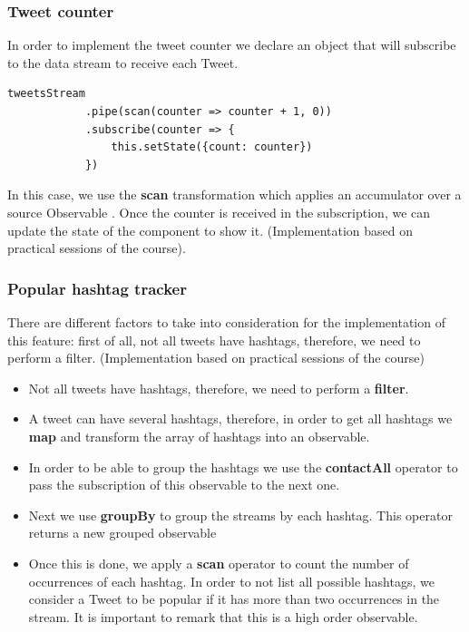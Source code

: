 \documentclass[12pt]{report}
\begin{document}
\subsubsection{Tweet counter}
In order to implement the tweet counter we declare an object that will subscribe to the data stream to receive each Tweet.
\begin{verbatim}
tweetsStream
            .pipe(scan(counter => counter + 1, 0))
            .subscribe(counter => {
                this.setState({count: counter})
            })
\end{verbatim}
In this case, we use the \textbf{scan} transformation which applies an accumulator over a source Observable \cite{rxjs}. Once the counter is received in the subscription, we can update the state of the component to show it. (Implementation based on practical sessions of the course).

\subsubsection{Popular hashtag tracker}
There are different factors to take into consideration for the implementation of this feature: first of all, not all tweets have hashtags, therefore, we need to perform a filter. (Implementation based on practical sessions of the course)

\begin{itemize}
\item Not all tweets have hashtags, therefore, we need to perform a \textbf{filter}.
\item A tweet can have several hashtags, therefore, in order to get all hashtags we \textbf{map} and transform the array of hashtags into an observable.

\item In order to be able to group the hashtags we use the \textbf{contactAll} operator to pass the subscription of this observable to the next one.

\item Next we use \textbf{groupBy} to group the streams by each hashtag. This operator returns a new grouped observable

\item Once this is done, we apply a \textbf{scan} operator to count the number of occurrences of each hashtag. In order to not list all possible hashtags, we consider a Tweet to be popular if it has more than two occurrences in the stream. It is important to remark that this is a high order observable. 
\end{itemize}
\end{document}
